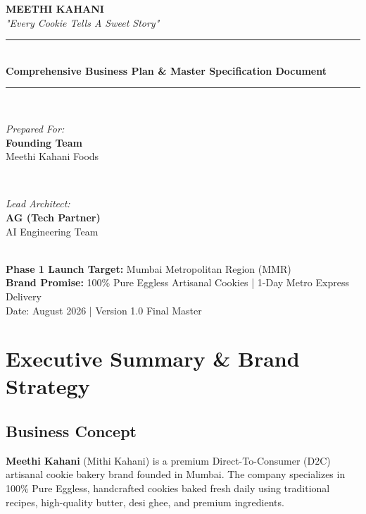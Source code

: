 \documentclass[11pt,a4paper]{article}
\begin{document}
\begin{titlepage}
    \centering
    \vspace*{2cm}
    
    {\Huge \bfseries \textcolor{CrimsonRed}{MEETHI KAHANI}}\\[0.4cm]
    {\Large \textcolor{WarmGold}{\textit{"Every Cookie Tells A Sweet Story"}}}\\[1.5cm]
    
    \rule{\linewidth}{0.5mm}\\[0.4cm]
    {\huge \bfseries Comprehensive Business Plan \& Master Specification Document}\\[0.2cm]
    \rule{\linewidth}{0.5mm}\\[1.5cm]
    
    \begin{minipage}{0.4\textwidth}
        \begin{flushleft} \large
            \emph{Prepared For:}\\
            \textbf{Founding Team}\\
            Meethi Kahani Foods
        \end{flushleft}
    \end{minipage}
    ~
    \begin{minipage}{0.4\textwidth}
        \begin{flushright} \large
            \emph{Lead Architect:}\\
            \textbf{AG (Tech Partner)}\\
            AI Engineering Team
        \end{flushright}
    \end{minipage}\\[3cm]
    
    {\large \textbf{Phase 1 Launch Target:} Mumbai Metropolitan Region (MMR)}\\[0.2cm]
    {\large \textbf{Brand Promise:} 100\% Pure Eggless Artisanal Cookies | 1-Day Metro Express Delivery}\\[2cm]
    
    \vfill
    {\large Date: August 2026 | Version 1.0 Final Master}
\end{titlepage}

\tableofcontents
\newpage

\section{Executive Summary \& Brand Strategy}
\subsection{Business Concept}
\textbf{Meethi Kahani} (Mithi Kahani) is a premium Direct-To-Consumer (D2C) artisanal cookie bakery brand founded in Mumbai. The company specializes in 100\% Pure Eggless, handcrafted cookies baked fresh daily using traditional recipes, high-quality butter, desi ghee, and premium ingredients.
\end{document}
